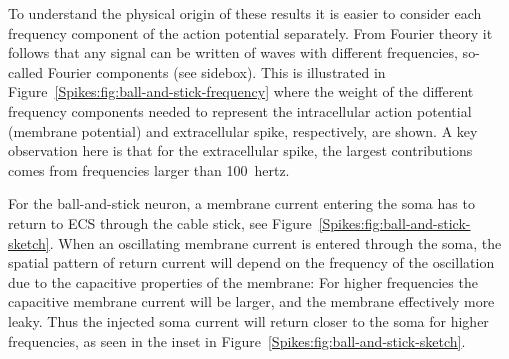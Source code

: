 To understand the physical origin of these results it is easier to consider each frequency 
component of the action potential separately. From Fourier theory it follows that any signal
can be written of waves with different frequencies, so-called Fourier components (see sidebox).  
This is illustrated in Figure~\ref{Spikes:fig:ball-and-stick-frequency} where the weight of the different frequency components needed to
represent the intracellular action potential (membrane potential) and extracellular spike, respectively, are shown.
A key observation here is that for the extracellular spike, the largest
contributions comes from frequencies larger than 100~hertz.

For the ball-and-stick neuron, a membrane current entering the soma has to return to ECS through the cable stick, see Figure~\ref{Spikes:fig:ball-and-stick-sketch}. When an oscillating membrane current is entered through the soma, the spatial pattern of return current will depend on the frequency of the oscillation due to the capacitive properties of the membrane: For higher frequencies the capacitive membrane current will be larger, and the 
membrane effectively more leaky. Thus the injected soma current will return closer to the soma for higher frequencies, 
as  seen in the inset in Figure~\ref{Spikes:fig:ball-and-stick-sketch}.  


